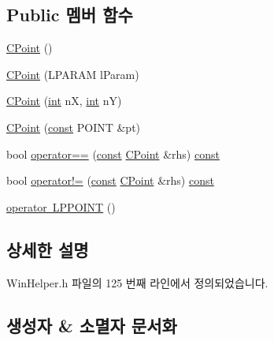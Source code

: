 \subsection*{Public 멤버 함수}
\begin{DoxyCompactItemize}
\item 
\mbox{\hyperlink{class_win_helper_1_1_c_point_a4782057717b0d09e643de9ce65835317}{C\+Point}} ()
\item 
\mbox{\hyperlink{class_win_helper_1_1_c_point_a1c07b1e078177dbd626443830d1bd8c8}{C\+Point}} (L\+P\+A\+R\+AM l\+Param)
\item 
\mbox{\hyperlink{class_win_helper_1_1_c_point_af80910f72f637b0cbbe5f45cdf692d70}{C\+Point}} (\mbox{\hyperlink{_util_8cpp_a0ef32aa8672df19503a49fab2d0c8071}{int}} nX, \mbox{\hyperlink{_util_8cpp_a0ef32aa8672df19503a49fab2d0c8071}{int}} nY)
\item 
\mbox{\hyperlink{class_win_helper_1_1_c_point_a24a90efac3a1cb2e699ea7cfa6f85bf6}{C\+Point}} (\mbox{\hyperlink{getopt1_8c_a2c212835823e3c54a8ab6d95c652660e}{const}} P\+O\+I\+NT \&pt)
\item 
bool \mbox{\hyperlink{class_win_helper_1_1_c_point_aad210b7d4619dad03142acdd689f4e46}{operator==}} (\mbox{\hyperlink{getopt1_8c_a2c212835823e3c54a8ab6d95c652660e}{const}} \mbox{\hyperlink{class_win_helper_1_1_c_point}{C\+Point}} \&rhs) \mbox{\hyperlink{getopt1_8c_a2c212835823e3c54a8ab6d95c652660e}{const}}
\item 
bool \mbox{\hyperlink{class_win_helper_1_1_c_point_a54c819ee7db3549434ac6e5cc8c6b103}{operator!=}} (\mbox{\hyperlink{getopt1_8c_a2c212835823e3c54a8ab6d95c652660e}{const}} \mbox{\hyperlink{class_win_helper_1_1_c_point}{C\+Point}} \&rhs) \mbox{\hyperlink{getopt1_8c_a2c212835823e3c54a8ab6d95c652660e}{const}}
\item 
\mbox{\hyperlink{class_win_helper_1_1_c_point_a3aa8bdc5ec8ff66c3492bc39c2a3e6a1}{operator L\+P\+P\+O\+I\+NT}} ()
\end{DoxyCompactItemize}


\subsection{상세한 설명}


Win\+Helper.\+h 파일의 125 번째 라인에서 정의되었습니다.



\subsection{생성자 \& 소멸자 문서화}
\mbox{\label{class_win_helper_1_1_c_point_a4782057717b0d09e643de9ce65835317}} 
